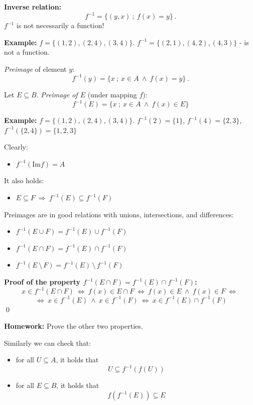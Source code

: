 \documentclass[11pt,paper=b5,footinclude,headinclude]{scrbook} %
\def\inn {{~\wedge~}}
\def\sledi {{~\Rightarrow~}}
\def\brez {{\,\setminus\,}}
\def\cee {{~\Leftrightarrow~}}
\theoremstyle{remark}
\theoremstyle{definition} %
\theoremstyle{theorem} %
\begin{document}
\bigskip
\textbf{ Inverse relation:}
$$f^{-1} = \{(y,x)~;~f(x) = y\}\,.$$
$f^{-1}$ is not necessarily a function!

\medskip
\textbf{ Example:} $f = \{(1,2),(2,4),(3,4)\}$.
$f^{-1} = \{(2,1),(4,2),(4,3)\}$ - is not a function.

\medskip
{\em Preimage} of element $y$:
$$f^{-1}(y) = \{x~;~x\in A\inn f(x) = y\}\,.$$

Let $E\subseteq B$. {\em Preimage of $E$} (under mapping $f$):
$$f^{-1}(E) = \{x~;~x\in A\inn f(x) \in E\}$$

\medskip
\textbf{ Example:} $f = \{(1,2),(2,4),(3,4)\}$.
$f^{-1}(2) = \{1\}$, $f^{-1}(4) = \{2,3\}$, $f^{-1}(\{2,4\}) = \{1,2,3\}$
\medskip

Clearly:
\begin{itemize}
  \item $f^{-1}(\textrm{Im}f) = A$
\end{itemize}

\bigskip
It also holds:
\begin{itemize}
  \item $E\subseteq F\sledi f^{-1}(E)\subseteq f^{-1}(F)$
\end{itemize}

\bigskip
Preimages are in good relations with unions, intersections, and differences:
\begin{itemize}
  \item $f^{-1}(E\cup F)= f^{-1}(E)\cup f^{-1}(F)$
  \item $f^{-1}(E\cap F)= f^{-1}(E)\cap f^{-1}(F)$
  \item $f^{-1}(E\brez F)= f^{-1}(E)\brez f^{-1}(F)$
\end{itemize}

\textbf{ Proof of the property $f^{-1}(E\cap F)= f^{-1}(E)\cap f^{-1}(F)$:}
$$x\in f^{-1}(E\cap F)\cee
f(x)\in E\cap F\cee
f(x)\in E \inn f(x)\in F\cee$$ $$\cee x\in f^{-1}(E) \inn x\in f^{-1}(F)
\cee x\in f^{-1}(E)\cap f^{-1}(F)$$
\qed

\textbf{ Homework:} Prove the other two properties.

\bigskip
Similarly we can check that:
\begin{itemize}
  \item for all  $U\subseteq A$, it holds that $$U\subseteq f^{-1}(f(U))$$
  \item for all $E\subseteq B$, it holds that $$f(f^{-1}(E))\subseteq E$$
\end{itemize}

\bigskip
\end{document}

